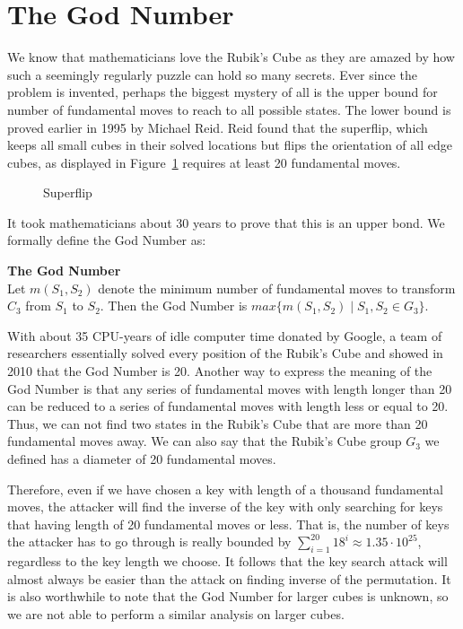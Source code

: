 \section{The God Number}
\par We know that mathematicians love the Rubik's Cube as they are amazed by how such a seemingly regularly puzzle can hold so many secrets. Ever since the problem is invented, perhaps the biggest mystery of all is the upper bound for number of fundamental moves to reach to all possible states. The lower bound is proved earlier in 1995 by Michael Reid\cite{god}. Reid found that the superflip, which keeps all small cubes in their solved locations but flips the orientation of all edge cubes, as displayed in Figure~\ref{fig:superflip} requires at least 20 fundamental moves. 
\begin{figure}[ht]
    \centering
    \RubikCubeSolvedWY
    \RubikRotation{\superflip}
    \caption{Superflip}
    \label{fig:superflip}
\end{figure}
It took mathematicians about 30 years to prove that this is an upper bond. We formally define the God Number as:
\newpage
\begin{definition}\textbf{The God Number} \\
    Let $m(S_1, S_2)$ denote the minimum number of fundamental moves to transform $C_3$ from $S_1$ to $S_2$. Then the God Number is $max\{m(S_1, S_2) \;|\; S_1, S_2 \in G_3\}$.
\end{definition}
\par With about 35 CPU-years of idle computer time donated by Google, a team of researchers essentially solved every position of the Rubik's Cube and showed in 2010 that the God Number is 20\cite{god}. Another way to express the meaning of the God Number is that any series of fundamental moves with length longer than 20 can be reduced to a series of fundamental moves with length less or equal to 20. Thus, we can not find two states in the Rubik's Cube that are more than 20 fundamental moves away. We can also say that the Rubik's Cube group $G_3$ we defined has a diameter of 20 fundamental moves.
\par Therefore, even if we have chosen a key with length of a thousand fundamental moves, the attacker will find the inverse of the key with only searching for keys that having length of 20 fundamental moves or less. That is, the number of keys the attacker has to go through is really bounded by $\sum_{i=1}^{20}18^i \approx 1.35 \cdot 10^{25}$, regardless to the key length we choose. It follows that the key search attack will almost always be easier than the attack on finding inverse of the permutation. It is also worthwhile to note that the God Number for larger cubes is unknown, so we are not able to perform a similar analysis on larger cubes.

